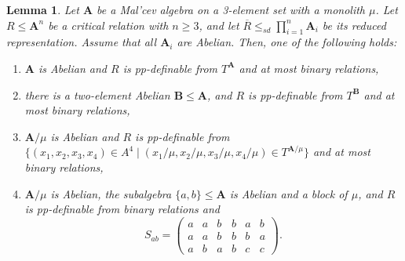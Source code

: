 \documentclass[12pt]{amsart}
\newtheorem{lemma}[theorem]{Lemma}
\theoremstyle{definition}
\theoremstyle{definition}
\newcommand{\alg}[1]{\mathbf{#1}}
\newcommand{\algA}{\alg{A}}
\newcommand{\algB}{\alg{B}}
\begin{document}
\begin{lemma} \label{lemma:critical2}
Let $\algA$ be a Mal'cev algebra on a 3-element set with a monolith $\mu$. Let $R\leq \alg{A}^n$ be a critical relation with $n\geq 3$, and let $\overline{R} \leq_{sd} \prod_{i=1}^n \alg{A}_i$ be its reduced representation. Assume that all $\algA_i$ are Abelian. Then, one of the following holds:
\begin{enumerate}
\item $\algA$ is Abelian and $R$ is pp-definable from $T^\algA$ and at most binary relations, \label{itm:case1}
\item there is a two-element Abelian $\alg{B} \leq \alg{A}$, and $R$ is pp-definable from $T^\algB$ and at most binary relations, \label{itm:case2}
\item $\alg{A}/\mu$ is Abelian and $R$ is pp-definable from $\{(x_1,x_2,x_3,x_4) \in A^4 \mid (x_1/\mu,x_2/\mu,x_3/\mu,x_4/\mu) \in T^{\alg{A}/\mu}\}$ and at most binary relations, \label{itm:case3}
\item $\alg{A}/\mu$ is Abelian, the subalgebra $\{a,b\} \leq \alg{A}$ is Abelian and a block of $\mu$, and $R$ is pp-definable from binary relations 
and 
\[S_{ab} = \begin{pmatrix}
a & a & b & b & a & b\\
a & a & b & b & b & a\\
a & b & a & b & c & c
\end{pmatrix}.\] \label{itm:case4}
\end{enumerate}
\end{lemma}
\end{document}
